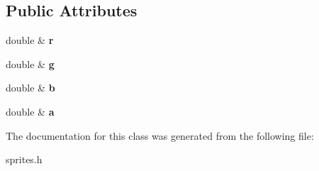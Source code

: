 \subsection*{Public Attributes}
\begin{DoxyCompactItemize}
\item 
\hypertarget{classg2c_1_1_color_a220175ad46233fa38e95e29e0b835b51}{
double \& {\bfseries r}}
\label{classg2c_1_1_color_a220175ad46233fa38e95e29e0b835b51}

\item 
\hypertarget{classg2c_1_1_color_a9bd8336365fca3ec12ee4613ed2317e9}{
double \& {\bfseries g}}
\label{classg2c_1_1_color_a9bd8336365fca3ec12ee4613ed2317e9}

\item 
\hypertarget{classg2c_1_1_color_abed8ad7dc0dfe06fd35900df9e293073}{
double \& {\bfseries b}}
\label{classg2c_1_1_color_abed8ad7dc0dfe06fd35900df9e293073}

\item 
\hypertarget{classg2c_1_1_color_acfdf10b4267939d773d5f2a2d171b6ef}{
double \& {\bfseries a}}
\label{classg2c_1_1_color_acfdf10b4267939d773d5f2a2d171b6ef}

\end{DoxyCompactItemize}


The documentation for this class was generated from the following file:\begin{DoxyCompactItemize}
\item 
sprites.h\end{DoxyCompactItemize}
